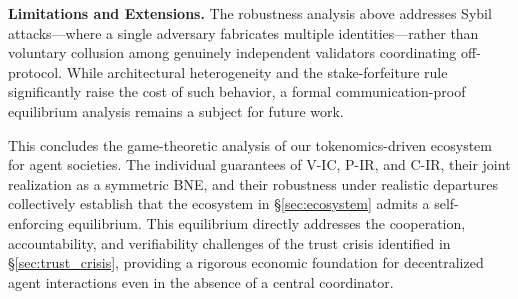 \noindent\textbf{Limitations and Extensions.} The robustness analysis above addresses Sybil attacks—where a single adversary fabricates multiple identities—rather than voluntary collusion among genuinely independent validators coordinating off-protocol. While architectural heterogeneity and the stake-forfeiture rule significantly raise the cost of such behavior, a formal communication-proof equilibrium analysis remains a subject for future work.

This concludes the game-theoretic analysis of our tokenomics-driven ecosystem for agent societies. The individual guarantees of V-IC, P-IR, and C-IR, their joint realization as a symmetric BNE, and their robustness under realistic departures collectively establish that the ecosystem in \S\ref{sec:ecosystem} admits a self-enforcing equilibrium. This equilibrium directly addresses the cooperation, accountability, and verifiability challenges of the trust crisis identified in \S\ref{sec:trust_crisis}, providing a rigorous economic foundation for decentralized agent interactions even in the absence of a central coordinator.

